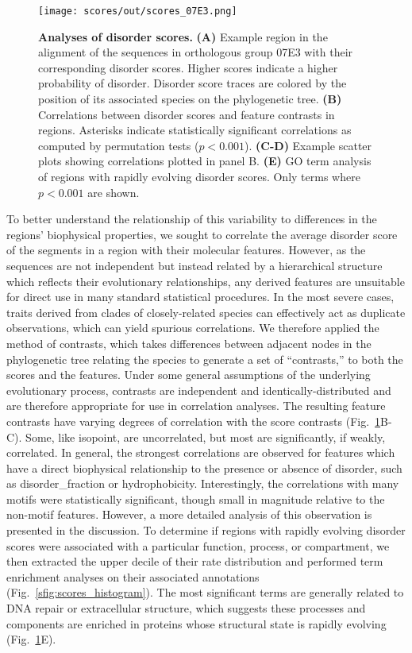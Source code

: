 \begin{figure}[h!]
\texttt{[image: scores/out/scores\_07E3.png]}
\centering
\caption{\textbf{Analyses of disorder scores.}
\textbf{(A)} Example region in the alignment of the sequences in orthologous group 07E3 with their corresponding disorder scores. Higher scores indicate a higher probability of disorder. Disorder score traces are colored by the position of its associated species on the phylogenetic tree. \textbf{(B)} Correlations between disorder scores and feature contrasts in regions. Asterisks indicate statistically significant correlations as computed by permutation tests ($p < 0.001$). \textbf{(C-D)} Example scatter plots showing correlations plotted in panel B. \textbf{(E)} GO term analysis of regions with rapidly evolving disorder scores. Only terms where $p < 0.001$ are shown.}
\label{fig:scores}
\end{figure}

To better understand the relationship of this variability to differences in the regions' biophysical properties, we sought to correlate the average disorder score of the segments in a region with their molecular features. However, as the sequences are not independent but instead related by a hierarchical structure which reflects their evolutionary relationships, any derived features are unsuitable for direct use in many standard statistical procedures. In the most severe cases, traits derived from clades of closely-related species can effectively act as duplicate observations, which can yield spurious correlations. We therefore applied the method of contrasts, which takes differences between adjacent nodes in the phylogenetic tree relating the species to generate a set of ``contrasts,'' to both the scores and the features. Under some general assumptions of the underlying evolutionary process, contrasts are independent and identically-distributed and are therefore appropriate for use in correlation analyses. The resulting feature contrasts have varying degrees of correlation with the score contrasts (Fig.~\ref{fig:scores}B-C). Some, like isopoint, are uncorrelated, but most are significantly, if weakly, correlated. In general, the strongest correlations are observed for features which have a direct biophysical relationship to the presence or absence of disorder, such as disorder\_fraction or hydrophobicity. Interestingly, the correlations with many motifs were statistically significant, though small in magnitude relative to the non-motif features. However, a more detailed analysis of this observation is presented in the discussion. To determine if regions with rapidly evolving disorder scores were associated with a particular function, process, or compartment, we then extracted the upper decile of their rate distribution and performed term enrichment analyses on their associated annotations (Fig.~\ref{sfig:scores_histogram}). The most significant terms are generally related to DNA repair or extracellular structure, which suggests these processes and components are enriched in proteins whose structural state is rapidly evolving (Fig.~\ref{fig:scores}E).

